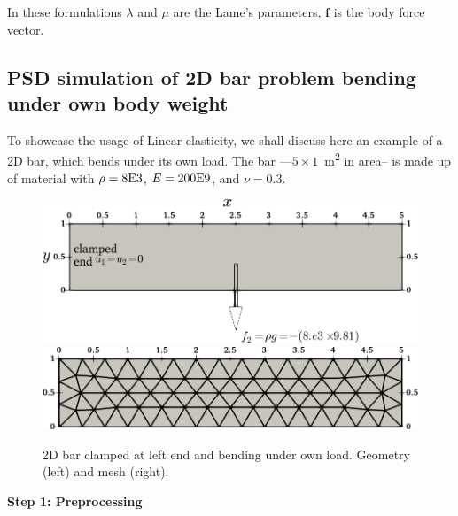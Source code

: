 \documentclass{report}
\begin{document}
In these formulations $\lambda$ and $\mu$ are the Lame's parameters, $\mathbf{f}$ is the body force vector.  

\subsection{PSD simulation of 2D bar problem bending under own body weight \label{sec:2d-bar-load}}

To showcase the usage of Linear elasticity, we shall discuss here an example of a 2D bar, which bends under its own load. The bar ---$5\times1$~\si{\square\meter} in area-- is made up of material with $\rho=8\text E3$, $E=200\text E9$, and $\nu=0.3$.

\begin{figure}[htbp]
    \centering
    \includegraphics[align=t,width=.44\textwidth]{./Images/2d-bar.png}\hspace{.1\textwidth}
    \includegraphics[align=t,width=.44\textwidth]{./Images/2d-bar-mesh.png}
    \caption{2D bar clamped at left end and bending under own load. Geometry (left) and mesh (right).}
    \label{fig:2Dbar}
\end{figure} 

\textbf{Step 1: Preprocessing}
\end{document}
